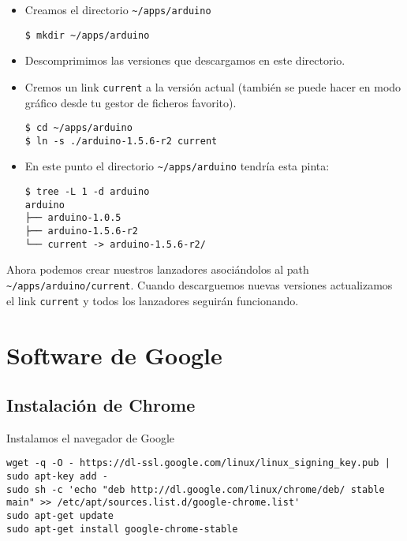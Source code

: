 \begin{itemize}
\item
  Creamos el directorio \texttt{\textasciitilde{}/apps/arduino}

\begin{verbatim}
$ mkdir ~/apps/arduino
\end{verbatim}
\item
  Descomprimimos las versiones que descargamos en este directorio.
\item
  Cremos un link \texttt{current} a la versión actual (también se puede
  hacer en modo gráfico desde tu gestor de ficheros favorito).

\begin{verbatim}
$ cd ~/apps/arduino
$ ln -s ./arduino-1.5.6-r2 current
\end{verbatim}
\item
  En este punto el directorio \texttt{\textasciitilde{}/apps/arduino}
  tendría esta pinta:

\begin{verbatim}
$ tree -L 1 -d arduino
arduino
├── arduino-1.0.5
├── arduino-1.5.6-r2
└── current -> arduino-1.5.6-r2/
\end{verbatim}
\end{itemize}

Ahora podemos crear nuestros lanzadores asociándolos al path
\texttt{\textasciitilde{}/apps/arduino/current}. Cuando descarguemos
nuevas versiones actualizamos el link \texttt{current} y todos los
lanzadores seguirán funcionando.

\section{Software de Google}\label{software-de-google}

\subsection{Instalación de Chrome}\label{instalaciuxf3n-de-chrome}

Instalamos el navegador de Google

\begin{verbatim}
wget -q -O - https://dl-ssl.google.com/linux/linux_signing_key.pub | sudo apt-key add -
sudo sh -c 'echo "deb http://dl.google.com/linux/chrome/deb/ stable main" >> /etc/apt/sources.list.d/google-chrome.list'
sudo apt-get update
sudo apt-get install google-chrome-stable
      
\end{verbatim}

